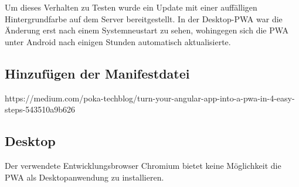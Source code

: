 Um dieses Verhalten zu Testen wurde ein Update mit einer auffälligen Hintergrundfarbe auf dem Server bereitgestellt. In der Desktop-PWA war die Änderung erst nach einem Systemneustart zu sehen, wohingegen sich die PWA unter Android nach einigen Stunden automatisch aktualisierte.



\subsection{Hinzufügen der Manifestdatei}
https://medium.com/poka-techblog/turn-your-angular-app-into-a-pwa-in-4-easy-steps-543510a9b626

\subsection{Desktop}


Der verwendete Entwicklungsbrowser Chromium bietet keine Möglichkeit die PWA als Desktopanwendung zu installieren.



